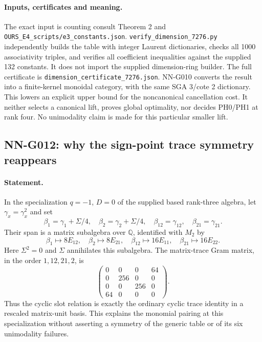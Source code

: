 \paragraph{Inputs, certificates and meaning.}
The exact input is counting consult Theorem 2 and
\texttt{OURS\_E4\_scripts/e3\_constants.json}.
\texttt{verify\_dimension\_7276.py} independently builds the
table with integer Laurent dictionaries, checks all 1000
associativity triples, and verifies all coefficient inequalities
against the supplied 132 constants. It does not import the
supplied dimension-ring builder. The full certificate is
\texttt{dimension\_certificate\_7276.json}.
NN-G010 converts the result into a finite-kernel monoidal
category, with the same SGA 3/cote 2 dictionary. This lowers
an explicit upper bound for the noncanonical cancellation
cost. It neither selects a canonical lift, proves global
optimality, nor decides PH0/PH1 at rank four. No unimodality
claim is made for this particular smaller lift.

\subsection{NN-G012: why the sign-point trace symmetry reappears}
\paragraph{Statement.}
In the specialization $q=-1$, $D=0$ of the supplied based
rank-three algebra, let $\gamma_x=\gamma_x^2$ and set
\[
 \beta_1=\gamma_1+\Sigma/4,\quad
 \beta_2=\gamma_2+\Sigma/4,\quad
 \beta_{12}=\gamma_{12},\quad\beta_{21}=\gamma_{21}.
\]
Their span is a matrix subalgebra over $\mathbb Q$, identified
with $M_2$ by
\[
 \beta_1\mapsto8E_{12},\quad\beta_2\mapsto8E_{21},\quad
 \beta_{12}\mapsto16E_{11},\quad\beta_{21}\mapsto16E_{22}.
 \tag{G012.1}
\]
Here $\Sigma^2=0$ and $\Sigma$ annihilates this subalgebra.
The matrix-trace Gram matrix, in the order $1,12,21,2$, is
\[
 \begin{pmatrix}0&0&0&64\\0&256&0&0\\0&0&256&0\\64&0&0&0\end{pmatrix}.
 \tag{G012.2}
\]
Thus the cyclic slot relation is exactly the ordinary cyclic
trace identity in a rescaled matrix-unit basis. This explains
the monomial pairing at this specialization without asserting
a symmetry of the generic table or of its six unimodality
failures.

